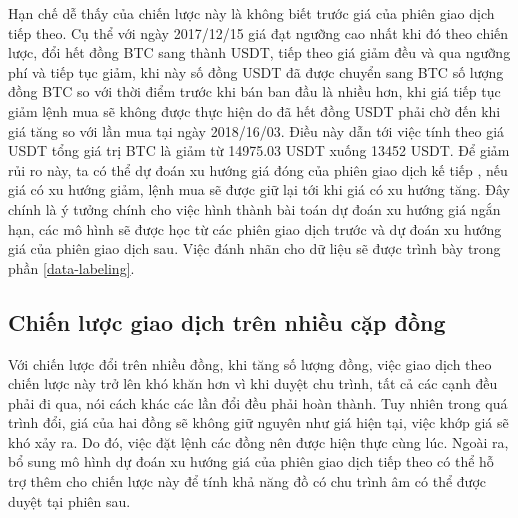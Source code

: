 Hạn chế dễ thấy của chiến lược này là không biết trước giá của phiên giao dịch tiếp theo. Cụ thể với ngày 2017/12/15 giá đạt ngưỡng cao nhất khi đó theo chiến lược, đổi hết đồng BTC sang thành USDT, tiếp theo giá giảm đều và qua ngưỡng phí và tiếp tục giảm, khi này số đồng USDT đã được chuyển sang BTC số lượng đồng BTC so với thời điểm trước khi bán ban đầu là nhiều hơn, khi giá tiếp tục giảm lệnh mua sẽ không được thực hiện do đã hết đồng USDT phải chờ đến khi giá tăng so với lần mua tại ngày 2018/16/03. Điều này dẫn tới việc tính theo giá USDT tổng giá trị BTC là giảm từ 14975.03 USDT xuống 13452 USDT. Để giảm rủi ro này, ta có thể dự đoán xu hướng giá đóng của phiên giao dịch kế tiếp
, nếu giá có xu hướng giảm, lệnh mua sẽ được giữ lại tới khi giá có xu hướng tăng. Đây chính là ý tưởng chính cho việc hình thành bài toán dự đoán xu hướng giá ngắn hạn, các mô hình sẽ được học từ các phiên giao dịch trước và dự đoán xu hướng giá của phiên giao dịch sau. Việc đánh nhãn cho dữ liệu sẽ được trình bày trong phần \ref{data-labeling}.
\subsection{Chiến lược giao dịch trên nhiều cặp đồng}
Với chiến lược đổi trên nhiều đồng, khi tăng số lượng đồng, việc giao dịch theo chiến lược này trở lên khó khăn hơn vì khi duyệt chu trình, tất cả các cạnh đều phải đi qua, nói cách khác các lần đổi đều phải hoàn thành. Tuy nhiên trong quá trình đổi, giá của hai đồng sẽ không giữ nguyên như giá hiện tại, việc khớp giá sẽ khó xảy ra. Do đó, việc đặt lệnh các đồng nên được hiện thực cùng lúc. Ngoài ra, bổ sung mô hình dự đoán xu hướng giá của phiên giao dịch tiếp theo có thể hỗ trợ thêm cho chiến lược này để tính khả năng đồ có chu trình âm có thể được duyệt tại phiên sau.




